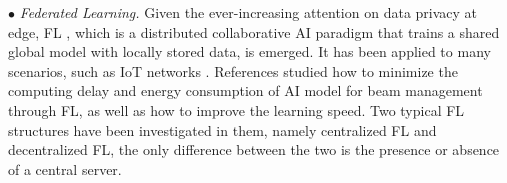 \documentclass[journal,comsoc]{IEEEtran}
\begin{document}
$\bullet$ \emph{Federated Learning.} Given the ever-increasing attention on data privacy at edge, FL \cite{FL-2021}, which is a distributed collaborative AI paradigm that trains a shared global model with locally stored data, is emerged. It has been applied to many scenarios, such as IoT networks \cite{Fairness-Awar-Federated-Learning}. References \cite{Beam-Management-Ultra-Dense-mmWave-Network-2023,Federated-Learning-Hybrid-Beamforming-2020,Federated-mmWave-Beam-Selection-LIDAR-2021,Fully-Decentralized-Federated-Learning-On-Board-Mission-2021,Learning-Rate-Optimization-Federated-Learning-2021,Federated-Deep-Reinforcement-Learning-THz-Beam-Search-2022,Backdoor-Federated-Learning-2022,Self-Supervised-Deep-Learning-Beam-Steering-2022,Over-the-Air-Federated-Multi-Task-Learning-2023} studied how to minimize the computing delay and energy consumption of AI model for beam management through FL, as well as how to improve the learning speed. Two typical FL structures have been investigated in them, namely centralized FL and decentralized FL, the only difference between the two is the presence or absence of a central server.
\end{document}
